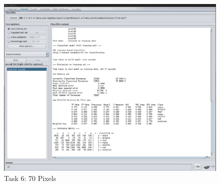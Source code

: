 \documentclass[12pt]{article}
\begin{document}
\begin{figure}[H]
	\centering
	\includegraphics[width=1\linewidth]{images/70_pixels}
	\caption{Task 6: 70 Pixels}
	\label{fig:task6_3}
\end{figure}
	
\end{document}
